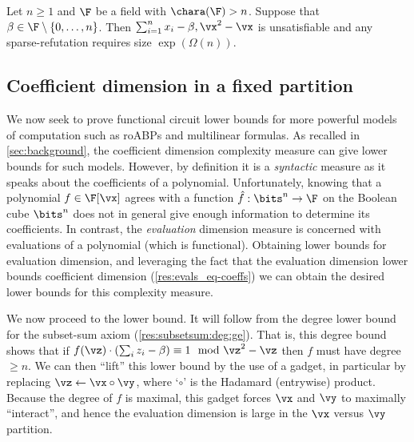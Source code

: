 \documentclass[11pt]{article}
\numberwithin{equation}{section}
\theoremstyle{definition}
\theoremstyle{plain}
\begin{document}
\begin{corollarywp}
        Let $n\ge 1$ and $\F$ be a field with $\chara(\F)>n$.  Suppose that $\beta\in \F\setminus\{0,\ldots,n\}$.  Then $\sum_{i=1}^n x_i-\beta,\vx^2-\vx$ is unsatisfiable and any sparse-\lIPS refutation requires size $\exp(\Omega(n))$.
\end{corollarywp}

\subsection{Coefficient dimension in a fixed partition}\label{sec:evaluation}

We now seek to prove functional circuit lower bounds for more powerful models of computation such as roABPs and multilinear formulas.  As recalled in \autoref{sec:background}, the coefficient dimension complexity measure can give lower bounds for such models.  However, by definition it is a \emph{syntactic} measure as it speaks about the coefficients of a polynomial.  Unfortunately, knowing that a polynomial $f\in\F[\vx]$ agrees with a function $\hat{f}:\bits^n\to\F$ on the Boolean cube $\bits^n$ does not in general give enough information to determine its coefficients.  In contrast, the \emph{evaluation} dimension measure is concerned with evaluations of a polynomial (which is functional).  Obtaining lower bounds for evaluation dimension, and leveraging the fact that the evaluation dimension lower bounds coefficient dimension (\autoref{res:evals_eq-coeffs}) we can obtain the desired lower bounds for this complexity measure.

We now proceed to the lower bound.  It will follow from the degree lower bound for the subset-sum axiom (\autoref{res:subsetsum:deg:ge}).  That is, this degree bound shows that if $f(\vz)\cdot(\sum_i z_i-\beta)\equiv 1\mod \vz^2-\vz$ then $f$ must have degree $\ge n$.  We can then ``lift'' this lower bound by the use of a gadget, in particular by replacing $\vz\leftarrow \vx\circ \vy$, where `$\circ$' is the Hadamard
%
(entrywise)   %
product.  Because the degree of $f$ is maximal, this gadget forces $\vx$ and $\vy$ to maximally ``interact'', and hence the evaluation dimension is large in the $\vx$ versus $\vy$ partition.
\end{document}
